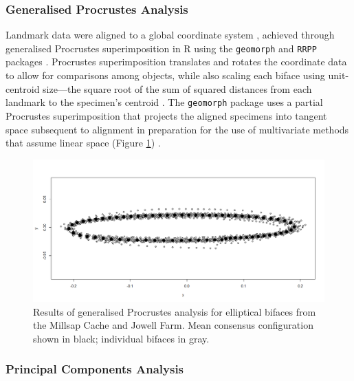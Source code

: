 \documentclass[]{interact}
\theoremstyle{plain}%
\theoremstyle{definition}
\theoremstyle{remark}
\begin{document}
\hypertarget{generalised-procrustes-analysis}{%
\subsubsection{Generalised Procrustes
Analysis}\label{generalised-procrustes-analysis}}

Landmark data were aligned to a global coordinate system
\citep{RN8477,RN7502,RN11622,RN11623,RN11563}, achieved through
generalised Procrustes superimposition \citep{RN11138,RN478,RN1646} in R
using the \texttt{geomorph} and \texttt{RRPP} packages
\citep{RN1655,RN11775,RN11530,RN1774,RN8605}. Procrustes superimposition
translates and rotates the coordinate data to allow for comparisons
among objects, while also scaling each biface using unit-centroid
size---the square root of the sum of squared distances from each
landmark to the specimen's centroid
\citep{RN11139,RN11140,RN11564,RN478}. The \texttt{geomorph} package
uses a partial Procrustes superimposition that projects the aligned
specimens into tangent space subsequent to alignment in preparation for
the use of multivariate methods that assume linear space (Figure
\ref{fig:gpa}) \citep{RN11141,RN11142,RN1646,RN11563}.

\begin{figure}\centering
\includegraphics[width=\linewidth]{figs/gpa.png}
\caption{Results of generalised Procrustes analysis for elliptical bifaces from the Millsap Cache and Jowell Farm. Mean consensus configuration shown in black; individual bifaces in gray.}
\label{fig:gpa}
\end{figure}

\hypertarget{principal-components-analysis}{%
\subsubsection{Principal Components
Analysis}\label{principal-components-analysis}}
\end{document}
